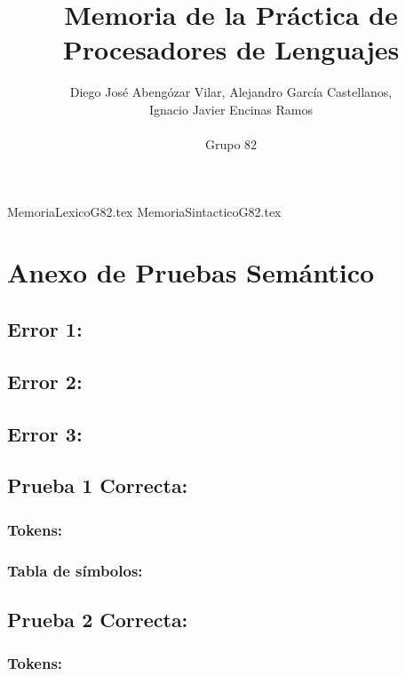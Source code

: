 \documentclass[a4paper, 12pt]{article}
\title{Memoria de la Práctica de Procesadores de Lenguajes}
\author{Diego José Abengózar Vilar, Alejandro García Castellanos,\\ Ignacio Javier Encinas Ramos\\\\Grupo 82}
\begin{document}
\maketitle
\tableofcontents
\newpage
{MemoriaLexicoG82.tex}
\newpage
{MemoriaSintacticoG82.tex}
\newpage
\section{Anexo de Pruebas Semántico}
\subsection*{Error 1:}



\subsection*{Error 2:}



\subsection*{Error 3:}



\subsection*{Prueba 1 Correcta:}

\subsubsection*{Tokens:}

\subsubsection*{Tabla de símbolos:}


\subsection*{Prueba 2 Correcta:}

\subsubsection*{Tokens:}

\end{document}
